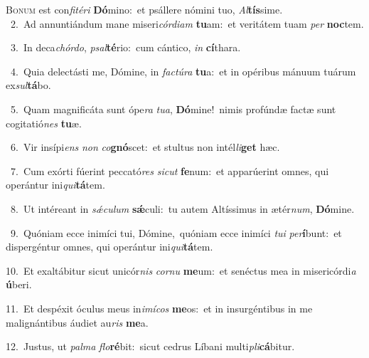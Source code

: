 \lettrine{\initial\textcolor{\initialcolor}{B}}{onum} est con\-\textit{fi}\-\textit{té}\textit{ri} \textbf{Dó}\-mino:~\star et psállere nómini tuo, \textit{Al}\-\textbf{tís}sime.\\
{\numbfont\textcolor{\numbcolor}{~2.}}~Ad annuntiándum mane miseri\-\textit{cór}\-\textit{di}\textit{am} \textbf{tu}\-am:~\star et veritátem tuam \textit{per} \textbf{noc}\-tem.\par
{\numbfont\textcolor{\numbcolor}{~3.}}~In deca\-\textit{chór}\-\textit{do}, \textit{psal}\-\textbf{té}rio:~\star cum cántico, \textit{in} \textbf{cí}\-thara.\par
{\numbfont\textcolor{\numbcolor}{~4.}}~Quia delectásti me, Dómine, in \textit{fac}\-\textit{tú}\textit{ra} \textbf{tu}\-a:~\star et in opéribus mánuum tuárum ex\-\textit{sul}\-\textbf{tá}bo.\par
{\numbfont\textcolor{\numbcolor}{~5.}}~Quam magnificáta sunt ópe\textit{ra} \textit{tu}\-\textit{a}, \textbf{Dó}\-mine!~\star nimis profúndæ factæ sunt cogitatió\textit{nes} \textbf{tu}\-æ.\par
{\numbfont\textcolor{\numbcolor}{~6.}}~Vir insípi\textit{ens} \textit{non} \textit{co}\-\textbf{gnó}scet:~\star et stultus non intél\-\textit{li}\-\textbf{get} hæc.\par
{\numbfont\textcolor{\numbcolor}{~7.}}~Cum exórti fúerint peccató\textit{res} \textit{sic}\-\textit{ut} \textbf{fe}\-num:~\star et apparúerint omnes, qui operántur ini\-\textit{qui}\-\textbf{tá}tem.\par
{\numbfont\textcolor{\numbcolor}{~8.}}~Ut intéreant in \textit{sǽ}\-\textit{cu}\textit{lum} \textbf{sǽ}\-culi:~\star tu autem Altíssimus in ætér\-\textit{num}\-, \textbf{Dó}\-mine.\par
{\numbfont\textcolor{\numbcolor}{~9.}}~Quóniam ecce inimíci tui, Dómine,~\dagger quóniam ecce inimíci \textit{tu}\-\textit{i} \textit{per}\-\textbf{í}bunt:~\star et dispergéntur omnes, qui operántur ini\-\textit{qui}\-\textbf{tá}tem.\par
{\numbfont\textcolor{\numbcolor}{10.}}~Et exaltábitur sicut unicór\textit{nis} \textit{cor}\-\textit{nu} \textbf{me}\-um:~\star et senéctus mea in misericórdi\textit{a} \textbf{ú}\-beri.\par
{\numbfont\textcolor{\numbcolor}{11.}}~Et despéxit óculus meus in\-\textit{i}\-\textit{mí}\textit{cos} \textbf{me}\-os:~\star et in insurgéntibus in me malignántibus áudiet au\textit{ris} \textbf{me}\-a.\par
{\numbfont\textcolor{\numbcolor}{12.}}~Justus, ut \textit{pal}\-\textit{ma} \textit{flo}\-\textbf{ré}bit:~\star sicut cedrus Líbani multi\-\textit{pli}\-\textbf{cá}bitur.\par
